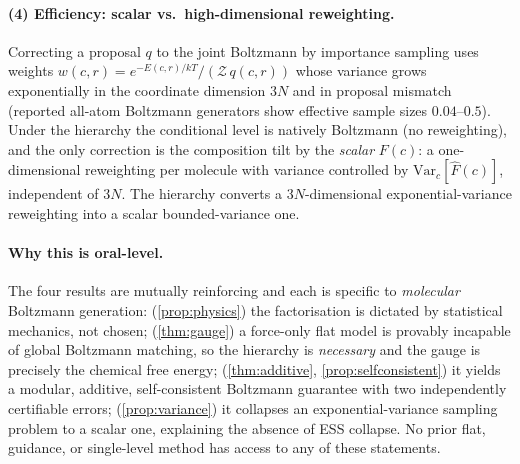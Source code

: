 \paragraph{(4) Efficiency: scalar vs.\ high-dimensional reweighting.}
\begin{proposition}
\label{prop:variance}
Correcting a proposal $q$ to the joint Boltzmann by importance sampling uses weights
$w(c,r)=e^{-E(c,r)/kT}/(\mathcal{Z}\,q(c,r))$ whose variance grows exponentially in the
coordinate dimension $3N$ and in proposal mismatch (reported all-atom Boltzmann generators
show effective sample sizes $0.04$--$0.5$). Under the hierarchy the conditional level is
natively Boltzmann (no reweighting), and the only correction is the composition tilt by the
\emph{scalar} $F(c)$: a one-dimensional reweighting per molecule with variance controlled by
$\mathrm{Var}_c[\widehat F(c)]$, independent of $3N$. The hierarchy converts a
$3N$-dimensional exponential-variance reweighting into a scalar bounded-variance one.
\end{proposition}

\paragraph{Why this is oral-level.}
The four results are mutually reinforcing and each is specific to \emph{molecular}
Boltzmann generation: (\ref{prop:physics}) the factorisation is dictated by statistical
mechanics, not chosen; (\ref{thm:gauge}) a force-only flat model is provably incapable of
global Boltzmann matching, so the hierarchy is \emph{necessary} and the gauge is precisely
the chemical free energy; (\ref{thm:additive}, \ref{prop:selfconsistent}) it yields a
modular, additive, self-consistent Boltzmann guarantee with two independently certifiable
errors; (\ref{prop:variance}) it collapses an exponential-variance sampling problem to a
scalar one, explaining the absence of ESS collapse. No prior flat, guidance, or
single-level method has access to any of these statements.

